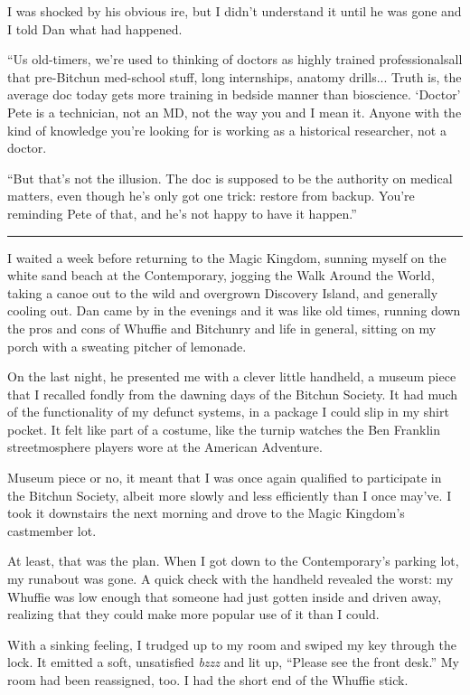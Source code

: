 I was shocked by his obvious ire, but I didn't understand it until
he was gone and I told Dan what had happened.

“Us old-timers, we're used to thinking of doctors as highly trained
professionals{\dash}all that pre-Bitchun med-school stuff, long
internships, anatomy drills... Truth is, the average doc today gets
more training in bedside manner than bioscience. ‘Doctor’ Pete is a
technician, not an MD, not the way you and I mean it. Anyone with
the kind of knowledge you're looking for is working as a historical
researcher, not a doctor.

“But that's not the illusion. The doc is supposed to be the
authority on medical matters, even though he's only got one trick:
restore from backup. You're reminding Pete of that, and he's not
happy to have it happen.”

\begin{center}\rule{1in}{0.4pt}\end{center}

I waited a week before returning to the Magic Kingdom, sunning
myself on the white sand beach at the Contemporary, jogging the
Walk Around the World, taking a canoe out to the wild and overgrown
Discovery Island, and generally cooling out. Dan came by in the
evenings and it was like old times, running down the pros and cons
of Whuffie and Bitchunry and life in general, sitting on my porch
with a sweating pitcher of lemonade.

On the last night, he presented me with a clever little handheld, a
museum piece that I recalled fondly from the dawning days of the
Bitchun Society. It had much of the functionality of my defunct
systems, in a package I could slip in my shirt pocket. It felt like
part of a costume, like the turnip watches the Ben Franklin
streetmosphere players wore at the American Adventure.

Museum piece or no, it meant that I was once again qualified to
participate in the Bitchun Society, albeit more slowly and less
efficiently than I once may've. I took it downstairs the next
morning and drove to the Magic Kingdom's castmember lot.

At least, that was the plan. When I got down to the Contemporary's
parking lot, my runabout was gone. A quick check with the handheld
revealed the worst: my Whuffie was low enough that someone had just
gotten inside and driven away, realizing that they could make more
popular use of it than I could.

With a sinking feeling, I trudged up to my room and swiped my key
through the lock. It emitted a soft, unsatisfied \emph{bzzz} and
lit up, “Please see the front desk.” My room had been reassigned,
too. I had the short end of the Whuffie stick.

